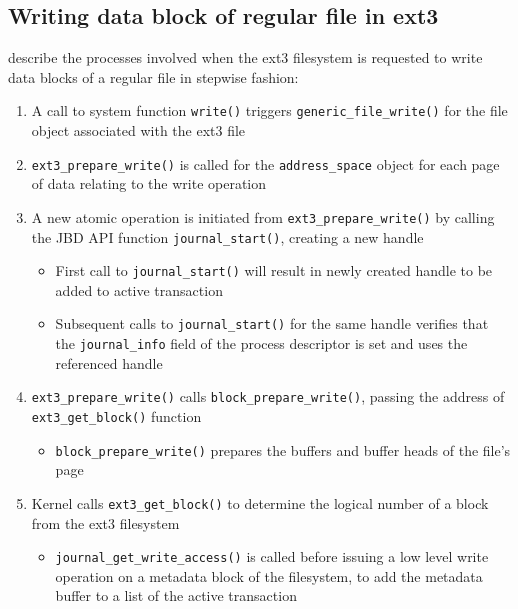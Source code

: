 \subsection{Writing data block of regular file in ext3}

\citet[p. 772-774]{Bovet2006} describe the processes involved when the ext3 filesystem is requested to write data blocks of a regular file in stepwise fashion:

\begin{enumerate}
	\item A call to system function \texttt{write()} triggers \texttt{generic_file_write()} for the file object associated with the ext3 file
	\item \texttt{ext3_prepare_write()} is called for the \texttt{address_space} object for each page of data relating to the write operation
	\item A new atomic operation is initiated from \texttt{ext3_prepare_write()} by calling the JBD API function \texttt{journal_start()}, creating a new handle
		\begin{itemize}
			\item First call to \texttt{journal_start()} will result in newly created handle to be added to active transaction
			\item Subsequent calls to \texttt{journal_start()} for the same handle verifies that the \texttt{journal_info} field of the process descriptor is set and uses the referenced handle
		\end{itemize}
	\item \texttt{ext3_prepare_write()} calls \texttt{block_prepare_write()}, passing the address of \texttt{ext3_get_block()} function
		\begin{itemize}
		\item \texttt{block_prepare_write()} prepares the buffers and buffer heads of the file's page
		\end{itemize}
	\item Kernel calls \texttt{ext3_get_block()} to determine the logical number of a block from the ext3 filesystem
		\begin{itemize}
		\item \texttt{journal_get_write_access()} is called before issuing a low level write operation on a metadata block of the filesystem, to add the metadata buffer to a list of the active transaction

\end{itemize}
\end{enumerate}
